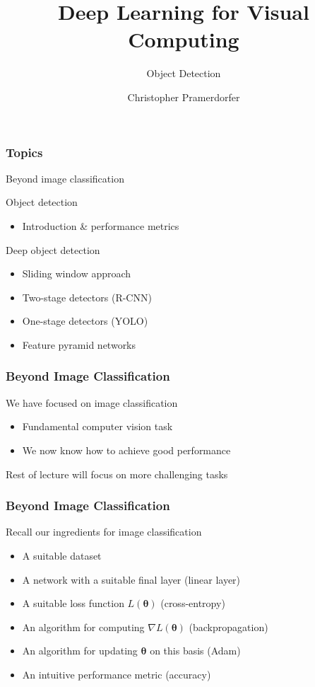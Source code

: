 \documentclass[xetex,professionalfont]{beamer}
\title{Deep Learning for Visual Computing}
\subtitle{Object Detection}
\author{Christopher Pramerdorfer}
\institute{Computer Vision Lab, TU Wien}
\newcommand{\bth}{\boldsymbol{\theta}}
\begin{document}
\begin{frame}
	\maketitle
\end{frame}


\begin{frame}
	\frametitle{Topics}

	Beyond image classification

	\bigskip

	Object detection
	\begin{itemize}
		\item Introduction \& performance metrics
	\end{itemize}

	\bigskip

	Deep object detection
	\begin{itemize}
		\item Sliding window approach
		\item Two-stage detectors (R-CNN)
		\item One-stage detectors (YOLO)
		\item Feature pyramid networks
	\end{itemize}

\end{frame}


\begin{frame}
	\frametitle{Beyond Image Classification}

	We have focused on image classification
	\begin{itemize}
		\item Fundamental computer vision task
		\item We now know how to achieve good performance
	\end{itemize}

	\bigskip

	Rest of lecture will focus on more challenging tasks

\end{frame}


\begin{frame}
	\frametitle{Beyond Image Classification}

	Recall our ingredients for image classification
	\begin{itemize}
		\item A suitable dataset
		\item A network with a suitable final layer (linear layer)
		\item A suitable loss function $L(\bth)$ (cross-entropy)
		\item An algorithm for computing $\nabla L(\bth)$ (backpropagation)
		\item An algorithm for updating $\bth$ on this basis (Adam)
		\item An intuitive performance metric (accuracy)
	\end{itemize}

\end{frame}
\end{document}
